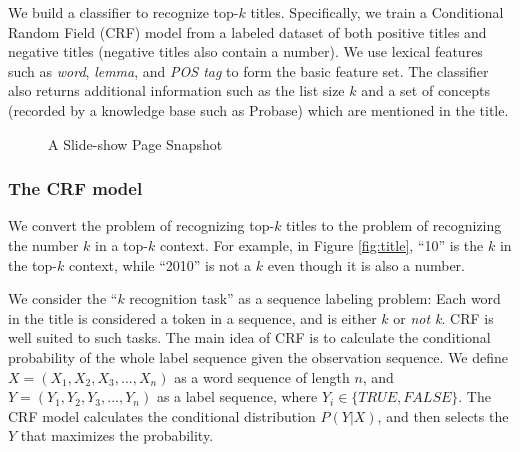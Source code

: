 We build a classifier to recognize top-$k$ titles.
Specifically, we train a Conditional Random Field (CRF)
\cite{CRFLafferty} model from a labeled dataset of both
positive titles and negative titles (negative titles also contain a
number).  We use lexical features such as {\em word}, {\em lemma}, and
{\em POS tag}\cite{santorini1990part} to form the basic feature set.  The classifier also
returns additional information such as the list size $k$ and a set of
concepts (recorded by a knowledge base such as Probase)
which are mentioned in the title.
%

\begin{figure}
\centering
{}
\caption{A Slide-show Page Snapshot\cite{TopFootball}}
\label{fig:slideshow}
\end{figure}

\subsubsection{The CRF model}
We convert the problem of recognizing top-$k$ titles to the problem of
recognizing the number $k$ in a top-$k$ context. For example, in
Figure \ref{fig:title}, ``10'' is the $k$ in the top-$k$ context,
while ``2010'' is not a $k$ even though it is also a number.

We consider the ``$k$ recognition task'' as a sequence labeling
problem: Each word in the title is considered a token in a sequence,
and is either $k$ or {\em not k}.
CRF is well suited to such tasks.
The main idea of CRF is to calculate the
conditional probability of the whole label sequence given the
observation sequence.  We define $X=(X_{1}, X_{2}, X_{3}, ..., X_{n})$ as
a word sequence of length $n$, and $Y=(Y_{1}, Y_{2}, Y_{3}, ..., Y_{n})$
as a label sequence, where $Y_{i} \in \{TRUE, FALSE\}$.  The CRF model
calculates the conditional distribution $P(Y|X)$, and then selects the
$Y$ that maximizes the probability.

